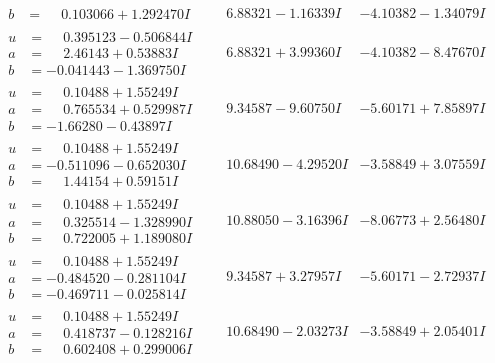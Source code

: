 \documentclass[1p]{elsarticle_modified}
\theoremstyle{definition}
\begin{document}
$$\begin{array}{c|c|c}
\begin{aligned}
b &= \phantom{-}0.103066 + 1.292470 I\end{aligned}
 & \phantom{-}6.88321 - 1.16339 I & -4.10382 - 1.34079 I \\ \hline\begin{aligned}
u &= \phantom{-}0.395123 - 0.506844 I \\
a &= \phantom{-}2.46143 + 0.53883 I \\
b &= -0.041443 - 1.369750 I\end{aligned}
 & \phantom{-}6.88321 + 3.99360 I & -4.10382 - 8.47670 I \\ \hline\begin{aligned}
u &= \phantom{-}0.10488 + 1.55249 I \\
a &= \phantom{-}0.765534 + 0.529987 I \\
b &= -1.66280 - 0.43897 I\end{aligned}
 & \phantom{-}9.34587 - 9.60750 I & -5.60171 + 7.85897 I \\ \hline\begin{aligned}
u &= \phantom{-}0.10488 + 1.55249 I \\
a &= -0.511096 - 0.652030 I \\
b &= \phantom{-}1.44154 + 0.59151 I\end{aligned}
 & \phantom{-}10.68490 - 4.29520 I & -3.58849 + 3.07559 I \\ \hline\begin{aligned}
u &= \phantom{-}0.10488 + 1.55249 I \\
a &= \phantom{-}0.325514 - 1.328990 I \\
b &= \phantom{-}0.722005 + 1.189080 I\end{aligned}
 & \phantom{-}10.88050 - 3.16396 I & -8.06773 + 2.56480 I \\ \hline\begin{aligned}
u &= \phantom{-}0.10488 + 1.55249 I \\
a &= -0.484520 - 0.281104 I \\
b &= -0.469711 - 0.025814 I\end{aligned}
 & \phantom{-}9.34587 + 3.27957 I & -5.60171 - 2.72937 I \\ \hline\begin{aligned}
u &= \phantom{-}0.10488 + 1.55249 I \\
a &= \phantom{-}0.418737 - 0.128216 I \\
b &= \phantom{-}0.602408 + 0.299006 I\end{aligned}
 & \phantom{-}10.68490 - 2.03273 I & -3.58849 + 2.05401 I \\ \hline\begin{aligned}

\end{aligned}
\end{array}$$
\end{document}
